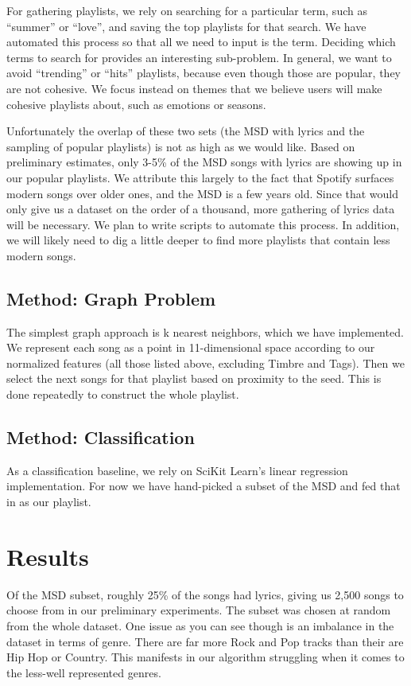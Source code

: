 \documentclass[10pt,journal,compsoc]{IEEEtran}
\begin{document}
For gathering playlists, we rely on searching for a particular term, such as ``summer'' or ``love'', and saving the top playlists for that search. We have automated this process so that all we need to input is the term. Deciding which terms to search for provides an interesting sub-problem. In general, we want to avoid ``trending'' or ``hits'' playlists, because even though those are popular, they are not cohesive. We focus instead on themes that we believe users will make cohesive playlists about, such as emotions or seasons.

Unfortunately the overlap of these two sets (the MSD with lyrics and the sampling of popular playlists) is not as high as we would like. Based on preliminary estimates, only 3-5\% of the MSD songs with lyrics are showing up in our popular playlists. We attribute this largely to the fact that Spotify surfaces modern songs over older ones, and the MSD is a few years old. Since that would only give us a dataset on the order of a thousand, more gathering of lyrics data will be necessary. We plan to write scripts to automate this process. In addition, we will likely need to dig a little deeper to find more playlists that contain less modern songs.

\subsection{Method: Graph Problem}
The simplest graph approach is k nearest neighbors, which we have implemented. We represent each song as a point in 11-dimensional space according to our normalized features (all those listed above, excluding Timbre and Tags). Then we select the next songs for that playlist based on proximity to the seed. This is done repeatedly to construct the whole playlist.

\subsection{Method: Classification}
As a classification baseline, we rely on SciKit Learn's \cite{scikit} linear regression implementation. For now we have hand-picked a subset of the MSD and fed that in as our playlist.

\section{Results}
Of the MSD subset, roughly 25\% of the songs had lyrics, giving us 2,500 songs to choose from in our preliminary experiments. The subset was chosen at random from the whole dataset. One issue as you can see though is an imbalance in the dataset in terms of genre. There are far more Rock and Pop tracks than their are Hip Hop or Country. This manifests in our algorithm struggling when it comes to the less-well represented genres.
\end{document}
